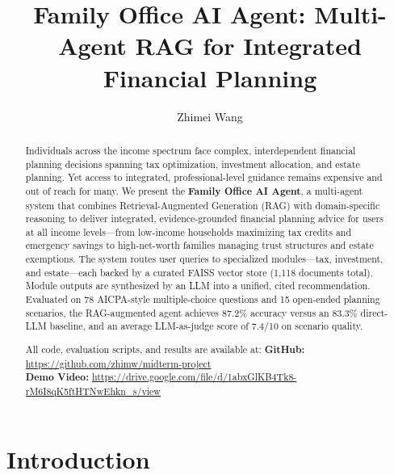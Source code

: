 \documentclass[sigplan,screen]{acmart}
\begin{document}
\title{Family Office AI Agent: Multi-Agent RAG for Integrated Financial Planning}

\author{Zhimei Wang}

\renewcommand{\shortauthors}{Wang}

\begin{abstract}
Individuals across the income spectrum face complex, interdependent financial planning decisions spanning tax optimization, investment allocation, and estate planning.
Yet access to integrated, professional-level guidance remains expensive and out of reach for many.
We present the \textbf{Family Office AI Agent}, a multi-agent system that combines Retrieval-Augmented Generation (RAG) with domain-specific reasoning to deliver integrated, evidence-grounded financial planning advice for users at all income levels---from low-income households maximizing tax credits and emergency savings to high-net-worth families managing trust structures and estate exemptions.
The system routes user queries to specialized modules---tax, investment, and estate---each backed by a curated FAISS vector store (1{,}118 documents total).
Module outputs are synthesized by an LLM into a unified, cited recommendation.
Evaluated on 78 AICPA-style multiple-choice questions and 15 open-ended planning scenarios, the RAG-augmented agent achieves 87.2\% accuracy versus an 83.3\% direct-LLM baseline, and an average LLM-as-judge score of 7.4/10 on scenario quality.

All code, evaluation scripts, and results are available at:
\textbf{GitHub:} \url{https://github.com/zhimw/midterm-project} \\
\textbf{Demo Video:} \url{https://drive.google.com/file/d/1abxGlKB4Tk8-rM6I8qK5ftHTNwEhkn_s/view}
\end{abstract}

\maketitle
\fancyfoot{}
\thispagestyle{plain}
\pagestyle{plain}

\section{Introduction}
\end{document}
